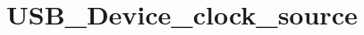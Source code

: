 \hypertarget{group___u_s_b___device__clock__source}{\section{U\-S\-B\-\_\-\-Device\-\_\-clock\-\_\-source}
\label{group___u_s_b___device__clock__source}
}
